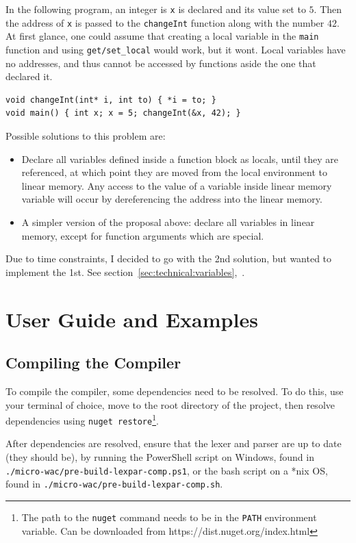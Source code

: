 \documentclass[a4paper]{article}
\begin{document}
In the following program, an integer is \texttt{x} is declared and its value set to $5$. Then the address of \texttt{x} is passed to the \texttt{changeInt} function along with the number $42$. At first glance, one could assume that creating a local variable in the \texttt{main} function and using \texttt{get/set\_local} would work, but it wont. Local variables have no addresses, and thus cannot be accessed by functions aside the one that declared it.
\begin{verbatim}
void changeInt(int* i, int to) { *i = to; }
void main() { int x; x = 5; changeInt(&x, 42); }
\end{verbatim}

\noindent Possible solutions to this problem are:
\begin{itemize}
	\item Declare all variables defined inside a function block as locals, until they are referenced, at which point they are moved from the local environment to linear memory. Any access to the value of a variable inside linear memory variable will occur by dereferencing the address into the linear memory.
	\item A simpler version of the proposal above: declare all variables in linear memory, except for function arguments which are special.
\end{itemize}

Due to time constraints, I decided to go with the 2nd solution, but wanted to implement the 1st. See section~\ref{sec:technical:variables},~.

\newpage
\section{User Guide and Examples}
\label{sec:user-guide}

\subsection{Compiling the Compiler}
\label{sec:user-guide:compile-compiler}
To compile the compiler, some dependencies need to be resolved. To do this, use your terminal of choice, move to the root directory of the project, then resolve dependencies using \texttt{nuget restore}\footnote{The path to the \texttt{nuget} command needs to be in the \texttt{PATH} environment variable. Can be downloaded from https://dist.nuget.org/index.html}.

After dependencies are resolved, ensure that the lexer and parser are up to date (they should be), by running the PowerShell script on Windows, found in \texttt{./micro-wac/pre-build-lexpar-comp.ps1}, or the bash script on a *nix OS, found in \texttt{./micro-wac/pre-build-lexpar-comp.sh}.
\end{document}
